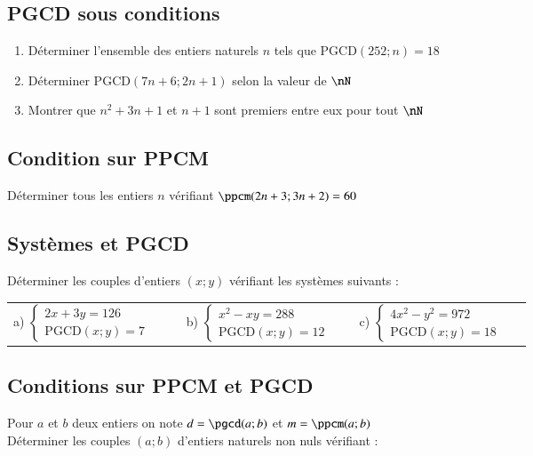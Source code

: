\documentclass[oneside,12pt]{article}          %
\begin{document}
\subsection{PGCD sous conditions}
\begin{enumerate}
    \item Déterminer l'ensemble des entiers naturels $n$ tels que $\mathrm{PGCD}(252;n)=18$
    \item Déterminer $\mathrm{PGCD}(7n+6;2n+1)$ selon la valeur de $\nN$
    \item Montrer que $n^2+3n+1$ et $n+1$ sont premiers entre eux pour tout $\nN$
\end{enumerate}



\subsection{Condition sur PPCM}
Déterminer tous les entiers $n$ vérifiant $\ppcm(2n+3;3n+2)=60$



\subsection{Systèmes et PGCD}
Déterminer les couples d'entiers $(x;y)$ vérifiant les systèmes suivants :

\begin{tabular}{p{0.3\linewidth} p{0.3\linewidth} p{0.3\linewidth}}
    a) $\begin{cases}2x+3y=126\\ \mathrm{PGCD}(x;y)=7\end{cases}$ & 
    b) $\begin{cases}x^2-xy=288\\ \mathrm{PGCD}(x;y)=12\end{cases}$ & 
    c) $\begin{cases}4x^2-y^2=972\\\mathrm{PGCD}(x;y)=18\end{cases}$
\end{tabular}



\subsection{Conditions sur PPCM et PGCD}
Pour $a$ et $b$ deux entiers on note $d=\pgcd(a;b)$ et $m=\ppcm(a;b)$\\
Déterminer les couples $(a;b)$ d'entiers naturels non nuls vérifiant :
\end{document}
